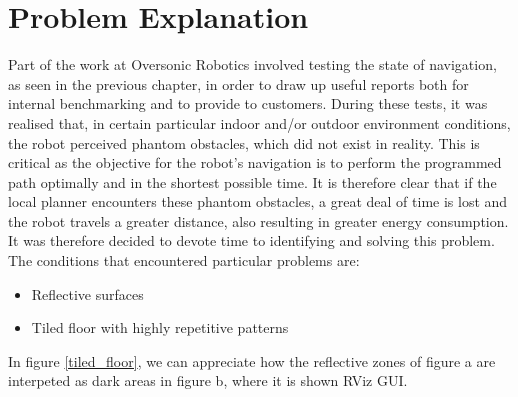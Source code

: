 \section{Problem Explanation}
Part of the work at Oversonic Robotics involved testing the state of navigation, as seen in the previous chapter, in order to draw up useful reports both for internal benchmarking and to provide to customers.
During these tests, it was realised that, in certain particular indoor and/or outdoor environment conditions, the robot perceived phantom obstacles, which did not exist in reality.
This is critical as the objective for the robot's navigation is to perform the programmed path optimally and in the shortest possible time. It is therefore clear that if the local planner encounters these phantom obstacles, a great deal of time is lost and the robot travels a greater distance, also resulting in greater energy consumption.
It was therefore decided to devote time to identifying and solving this problem.
The conditions that encountered particular problems are: 
\begin{itemize}
    \item Reflective surfaces
    \item Tiled floor with highly repetitive patterns
\end{itemize}
In figure \ref{tiled_floor}, we can appreciate how the reflective zones of figure a are interpeted as dark areas in figure b, where it is shown RViz GUI.
